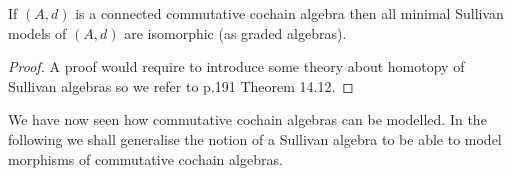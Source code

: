 \begin{Theorem}
 \label{thm:UniquenessOfModels}
 If $(A,d)$ is a connected commutative cochain algebra then all minimal Sullivan models of $(A,d)$ are isomorphic
 (as graded algebras).
\end{Theorem}
\begin{proof}
 A proof would require to introduce some theory about homotopy of Sullivan algebras so we refer to \cite{Felix2001}
 p.191 Theorem 14.12.
\end{proof}


% 
% 
% 


We have now seen how commutative cochain algebras can be modelled. In the following we shall generalise the notion of
a Sullivan algebra to be able to model morphisms of commutative cochain algebras.

